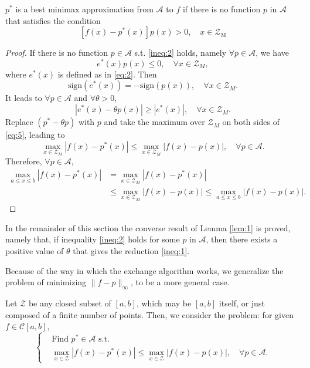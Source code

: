\documentclass[11pt]{article}
\begin{document}
\begin{lemma} \label{lem:1}
$p^{*}$ is a best minimax approximation from $\mathscr{A}$ to $f$ if there is no function $p$ in $\mathscr{A}$ that satisfies the condition
\begin{equation}
\left[f(x)-p^{*}(x)\right] p(x)>0, \quad x \in \mathscr{Z}_{\mathrm{M}} \label{ineq:2}
\end{equation}
\end{lemma}
\begin{proof}
If there is no function $p\in\mathscr{A}$ s.t. \eqref{ineq:2} holds, namely $\forall p\in\mathscr{A}$, we have 
\[
e^*(x) p(x) \leqslant 0,\quad \forall x\in\mathscr{Z}_M,
\]
where $e^*(x)$ is defined as in \eqref{eq:2}. Then
\[
\mathrm{sign}(e^*(x)) = -\mathrm{sign}(p(x)),\quad \forall x\in\mathscr{Z}_M.
\]
It leads to $\forall p\in \mathscr{A}$ and $\forall \theta>0$, 
\begin{equation}
\left | e^*(x) -\theta p(x)\right | \geqslant |e^*(x)|,\quad \forall x\in \mathscr{Z}_M.
\label{eq:5}
\end{equation}
Replace $(p^*-\theta p)$ with $p$ and take the maximum over $\mathscr{Z}_M$ on both sides of \eqref{eq:5}, leading to 
\[
\max_{x\in\mathscr{Z}_M } |f(x) - p^*(x)| \leqslant \max_{x\in\mathscr{Z}_M} |f(x) - p(x)|,\quad \forall p\in\mathscr{A}.
\]
Therefore, $\forall p\in\mathscr{A}$,
\[
\begin{aligned}
 \max_{a\leqslant x \leqslant b} |f(x) - p^*(x)| & = \max_{x\in\mathscr{Z}_M} |f(x) - p^*(x)| \\
& \leqslant \max_{x\in\mathscr{Z}_M} |f(x) - p(x)| \leqslant \max_{a\leqslant x\leqslant b} |f(x) - p(x)|.
\end{aligned}
\]
\end{proof}


In the remainder of this section the converse result of Lemma \ref{lem:1} is proved, namely that, if inequality \eqref{ineq:2} holds for some $p$ in $\mathscr{A}$, then there exists a positive value of $\theta$ that gives the reduction \eqref{ineq:1}.

Because of the way in which the exchange algorithm works, we generalize the problem of minimizing $\|f-p\|_{\infty}$, to be a more general case.

Let $\mathscr{Z}$ be any closed subset of $[a,b]$, which may be $[a,b]$ itself, or just composed of a finite number of points. Then, we consider the problem: for given $f\in\mathscr{C}[a,b]$,
\begin{equation}
\left \{
\begin{aligned}
&\text{Find } p^*\in\mathscr{A} \text{ s.t.}\\
& \max_{x\in\mathscr{Z}} |f(x) - p^*(x)| \leqslant \max_{x\in \mathscr{Z}} |f(x) - p(x)|,\quad \forall p\in \mathscr{A}.
\end{aligned}
\right .
\label{problem:2}
\end{equation}
\end{document}

